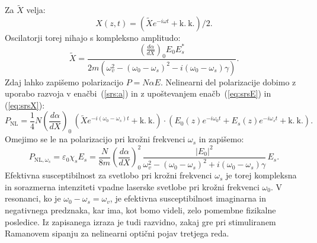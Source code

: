 Za $\tilde{X}$ velja:
\begin{equation}
X(z,t) = \left(\tilde{X}e^{-i\omega t}+ \mathrm{k.~k.}\right)/2\!\!.
\label{eq:srsX}
\end{equation}
Oscilatorji torej nihajo s kompleksno amplitudo:
\begin{equation}
\tilde{X} = \frac{\left(\frac{d\alpha}{dX}\right)_0 E_0 E_s^*}{2m\left(
\omega_v^2-(\omega_0-\omega_s)^2-i(\omega_0-\omega_s)\gamma\right)}.
\end{equation}
Zdaj lahko zapišemo polarizacijo $P = N\alpha E$. Nelinearni del
polarizacije dobimo z uporabo razvoja v enačbi~(\ref{srs:a}) 
in z upoštevanjem enačb~(\ref{eq:srsE}) in (\ref{eq:srsX}):
\begin{equation}
P_{\mathrm{NL}} = \frac{1}{4} N \left(\frac{d\alpha}{dX}\right)_0 \, \left(\tilde{X}
e^{-i(\omega_0-\omega_s)t}
+ \mathrm{k.~k.}\right) \cdot \left( E_0(z)e^{-i\omega_0t}+ E_s(z)e^{-i\omega_st} + \mathrm{k.~k.}\right)\!\!.
\end{equation}
Omejimo se le na polarizacijo pri krožni frekvenci $\omega_s$ in zapišemo:
\begin{equation}
P_{\mathrm{NL},\omega_s} = \varepsilon_0 \chi_s E_s = 
\frac{N }{8m}\left(\frac{d\alpha}{dX}\right)_0^2 \, 
\frac{|E_0|^2}{\omega_v^2-(\omega_0-\omega_s)^2+i(\omega_0-\omega_s)\gamma}\,E_s.
\label{srs:chi}
\end{equation}
Efektivna susceptibilnost za svetlobo pri krožni frekvenci $\omega_s$ 
je  torej kompleksna in sorazmerna intenziteti 
vpadne laserske svetlobe pri krožni frekvenci $\omega_0$. 
V resonanci, ko je $\omega_0-\omega_s = \omega_v$, je efektivna susceptibilnost
imaginarna in negativnega predznaka, kar ima, kot bomo videli, zelo pomembne 
fizikalne posledice. Iz zapisanega izraza je tudi razvidno, zakaj gre pri 
stimuliranem Ramanovem sipanju za nelinearni optični pojav tretjega reda. 

